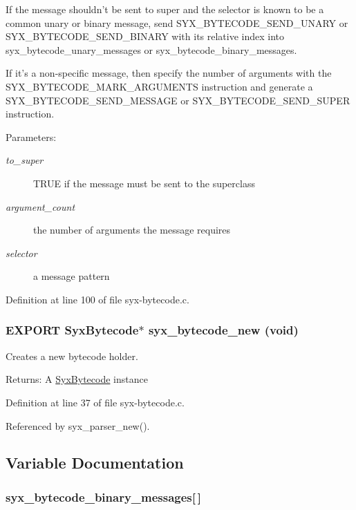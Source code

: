If the message shouldn't be sent to super and the selector is known to be a common unary or binary message, send SYX\_\-BYTECODE\_\-SEND\_\-UNARY or SYX\_\-BYTECODE\_\-SEND\_\-BINARY with its relative index into syx\_\-bytecode\_\-unary\_\-messages or syx\_\-bytecode\_\-binary\_\-messages.

If it's a non-specific message, then specify the number of arguments with the SYX\_\-BYTECODE\_\-MARK\_\-ARGUMENTS instruction and generate a SYX\_\-BYTECODE\_\-SEND\_\-MESSAGE or SYX\_\-BYTECODE\_\-SEND\_\-SUPER instruction.

\begin{Desc}
\item[Parameters:]
\begin{description}
\item[{\em to\_\-super}]TRUE if the message must be sent to the superclass \item[{\em argument\_\-count}]the number of arguments the message requires \item[{\em selector}]a message pattern \end{description}
\end{Desc}


Definition at line 100 of file syx-bytecode.c.\hypertarget{syx-bytecode_8h_e034d74f4bcb6913a9b807e87f534b8a}{
\subsubsection{\setlength{\rightskip}{0pt plus 5cm}EXPORT {\bf SyxBytecode}$\ast$ syx\_\-bytecode\_\-new (void)}}
\label{syx-bytecode_8h_e034d74f4bcb6913a9b807e87f534b8a}


Creates a new bytecode holder.

\begin{Desc}
\item[Returns:]A \hyperlink{struct_syx_bytecode}{SyxBytecode} instance \end{Desc}


Definition at line 37 of file syx-bytecode.c.

Referenced by syx\_\-parser\_\-new().

\subsection{Variable Documentation}
\hypertarget{syx-bytecode_8h_90d7e46b6b031c996ce7cc81083a6fa7}{
\subsubsection{ {\bf syx\_\-bytecode\_\-binary\_\-messages}\mbox{[}$\,$\mbox{]}}}
\label{syx-bytecode_8h_90d7e46b6b031c996ce7cc81083a6fa7}


